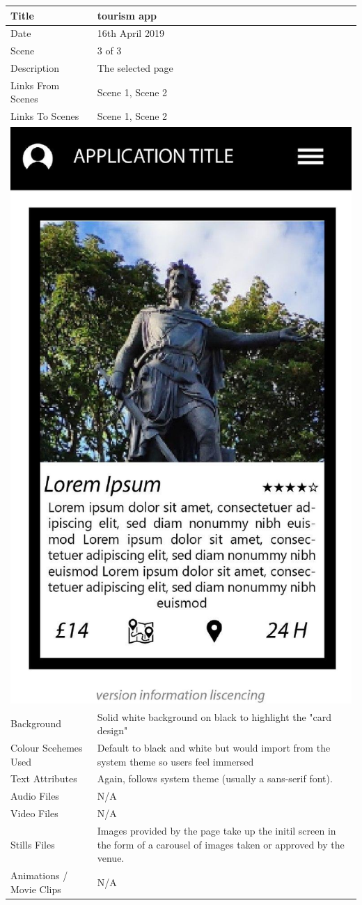 \hspace{-1cm}
	\begin{tabular}{p{4cm}p{10cm}}
		\hline
		Title & tourism app \\
		\hline
		Date & 16th April 2019 \\
		\hline
		Scene & 3 of 3 \\
		\hline
		Description & The selected page \\
		\hline
		Links From Scenes & Scene 1, Scene 2 \\
		\hline
		Links To Scenes & Scene 1, Scene 2 \\
		\hline
		\multicolumn{2}{c}{\includegraphics[width=0.5\linewidth]{images/screen2-1.jpg}} \\
		\hline
		Background & Solid white background on black to highlight the "card design" \\
		\hline
		Colour Scehemes Used & Default to black and white but would import from the system theme so users feel immersed \\
		\hline
		Text Attributes & Again, follows system theme (usually a sans-serif font). \\
		\hline
		Audio Files & N/A \\
		\hline
		Video Files & N/A \\
		\hline
		Stills Files & Images provided by the page take up the initil screen in the form of a carousel of images taken or approved by the venue. \\
		\hline
		Animations / Movie Clips & N/A \\

\end{tabular}

